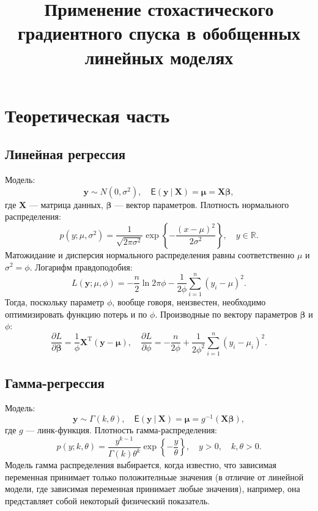 \documentclass[a4paper]{article}
\title{Применение стохастического градиентного спуска в обобщенных линейных моделях}
\date{}
\begin{document}
\maketitle


\section{Теоретическая часть}
\subsection{Линейная регрессия}
Модель:
\[
    \mathbf{y}\sim N(0, \sigma^2),\quad \mathsf{E}(\mathbf{y}~|~\mathbf{X})=\bm\mu=\mathbf{X} \bm\beta,
\]
где $\mathbf{X}$ — матрица данных, $\boldsymbol\beta$ — вектор параметров. Плотность нормального распределения:
\[
    p(y; \mu, \sigma^2)=\frac1{\sqrt{2\pi\sigma^2}}\exp\left\{-\frac{(x-\mu)^2}{2\sigma^2}\right\},\quad y\in \mathbb{R}.
\]
Матожидание и дисперсия нормального распределения равны соответственно $\mu$ и $\sigma^2=\phi$. Логарифм правдоподобия:
\[
    L(\mathbf{y}; \mu, \phi)=-\frac{n}{2}\ln2\pi\phi-\frac{1}{2\phi}\sum_{i=1}^n(y_i-\mu)^2.
\]
Тогда, поскольку параметр $\phi$, вообще говоря, неизвестен, необходимо оптимизировать функцию потерь и по $\phi$. Производные по вектору параметров $\bm\beta$ и $\phi$:
\[
    \frac{\partial L}{\partial\bm\beta}=\frac1\phi\mathbf{X}^\mathrm{T}(\mathbf{y}-\bm\mu),\quad \frac{\partial L}{\partial \phi}=-\frac{n}{2\phi} + \frac{1}{2\phi^2}\sum_{i=1}^n(y_i-\mu_i)^2.
\]

\subsection{Гамма-регрессия}
Модель:
\[
    \mathbf{y}\sim\Gamma(k, \theta), \quad \mathsf{E}(\mathbf y~|~ \mathbf{X})=\bm\mu=g^{-1}(\mathbf{X}\bm{\beta}),
\]
где $g$ --- линк-функция.
Плотность гамма-распределения:
\[
    p(y; k, \theta) = \frac{y^{k-1}}{\Gamma(k)\theta^k}\exp\left\{-\frac{y}{\theta}\right\},\quad y > 0,\quad k, \theta > 0.
\]
Модель гамма распределения выбирается, когда известно, что зависимая переменная принимает только положителньые значения (в отличие от линейной модели, где зависимая переменная принимает любые значения), например, она представляет собой некоторый физический показатель.
\end{document}
